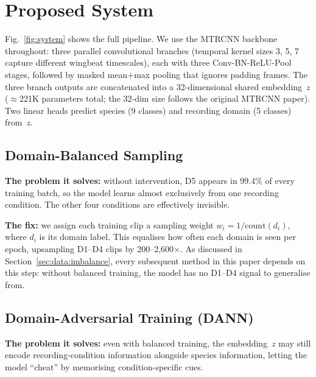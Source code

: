\section{Proposed System}
\label{sec:method}

Fig.~\ref{fig:system} shows the full pipeline.
We use the MTRCNN backbone~\cite{mtrcnn2025} throughout: three parallel
convolutional branches (temporal kernel sizes 3, 5, 7 capture different
wingbeat timescales), each with three Conv-BN-ReLU-Pool stages,
followed by masked mean$+$max pooling that ignores padding frames.
The three branch outputs are concatenated into a 32-dimensional
shared embedding~$z$ ($\approx$221K parameters total; the 32-dim size
follows the original MTRCNN paper).
Two linear heads predict species (9 classes) and recording domain
(5 classes) from~$z$.

\subsection{Domain-Balanced Sampling}
\label{sec:method:balance}

\textbf{The problem it solves:} without intervention, D5 appears in
99.4\% of every training batch, so the model learns almost exclusively
from one recording condition.
The other four conditions are effectively invisible.

\textbf{The fix:} we assign each training clip a sampling weight
$w_i = 1 / \text{count}(d_i)$, where $d_i$ is its domain label.
This equalises how often each domain is seen per epoch, upsampling
D1--D4 clips by 200--2{,}600$\times$.
As discussed in Section~\ref{sec:data:imbalance}, every subsequent
method in this paper depends on this step: without balanced training,
the model has no D1--D4 signal to generalise from.

\subsection{Domain-Adversarial Training (DANN)}
\label{sec:method:dann}

\textbf{The problem it solves:} even with balanced training, the
embedding~$z$ may still encode recording-condition information
alongside species information, letting the model ``cheat'' by
memorising condition-specific cues.

